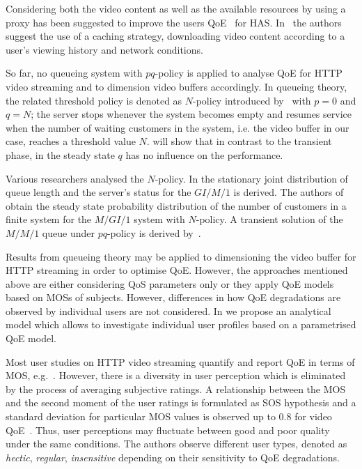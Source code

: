 Considering both the video content as well as the available resources by using a proxy has been suggested to improve the users \gls{QoE}~\cite{Essaili2013} for \gls{HAS}.
In~\cite{Xin2012} the authors suggest the use of a caching strategy, downloading video content according to a user's viewing history and network conditions.

So far, no queueing system with \(pq\)-policy is applied to analyse \gls{QoE} for \gls{HTTP} video streaming and to dimension video buffers accordingly.
In queueing theory, the related threshold policy is denoted as \(N\)-policy introduced by~\cite{Yadin1963} with \(p=0\) and \(q=N\); the server stops whenever the system becomes empty and resumes service when the number of waiting customers in the system, i.e. the video buffer in our case, reaches a threshold value \(N\).
 will show that in  contrast to the transient phase, in the steady state \(q\) has no influence on the performance. 

Various researchers analysed the \(N\)-policy.
In \cite{Zhang2004} the stationary joint distribution of queue length and the server's status for the \(GI/M/1\) is derived.
The authors of \cite{Wang2000} obtain the steady state probability distribution of the number of customers in a finite system for the \(M/GI/1\) system with \(N\)-policy.
A transient solution of the \(M/M/1\) queue under \(pq\)-policy is derived by~\cite{Boehm1993}.

Results from queueing theory may be applied to dimensioning the video buffer for \gls{HTTP} streaming in order to optimise \gls{QoE}. 
However, the approaches mentioned above are either considering \gls{QoS} parameters only or they apply \gls{QoE} models based on \glspl{MOS} of subjects.
However, differences in how \gls{QoE} degradations are observed by individual users are not considered.
In  we propose an analytical model which allows to investigate individual user profiles based on a parametrised QoE model.

Most user studies on \gls{HTTP} video streaming quantify and report \gls{QoE} in terms of \gls{MOS}, e.g.~\cite{Hossfeld2013c}.
However, there is a diversity in user perception which is eliminated by the process of averaging subjective ratings.
A relationship between the \gls{MOS} and the second moment of the user ratings is formulated as \gls{SOS} hypothesis and a standard deviation for particular \gls{MOS} values is observed up to \(0.8\) for video \gls{QoE}~\cite{Hossfeld2011b}. 
Thus, user perceptions may fluctuate between good and poor quality under the same conditions. The authors observe different user types, denoted as \emph{hectic}, \emph{regular}, \emph{insensitive} depending on their sensitivity to \gls{QoE} degradations.

